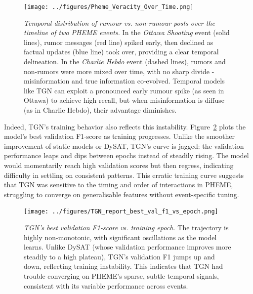 \documentclass{cshonours}
\begin{document}
\begin{figure}[htbp]

\centering

\texttt{[image: ../figures/Pheme\_Veracity\_Over\_Time.png]}

\caption[Temporal veracity trends in events]{\textit{Temporal distribution of rumour vs. non-rumour posts over the timeline of two PHEME events.} In the \emph{Ottawa Shooting} event (solid lines), rumor messages (red line) spiked early, then declined as factual updates (blue line) took over, providing a clear temporal delineation. In the \emph{Charlie Hebdo} event (dashed lines), rumors and non-rumors were more mixed over time, with no sharp divide - misinformation and true information co-evolved. Temporal models like TGN can exploit a pronounced early rumour spike (as seen in Ottawa) to achieve high recall, but when misinformation is diffuse (as in Charlie Hebdo), their advantage diminishes.}

\label{fig:veracity_time}

\end{figure}



Indeed, TGN's training behavior also reflects this instability. Figure~\ref{fig:tgn_val_f1} plots the model's best validation F1-score as training progresses. Unlike the smoother improvement of static models or DySAT, TGN's curve is jagged: the validation performance leaps and dips between epochs instead of steadily rising. The model would momentarily reach high validation scores but then regress, indicating difficulty in settling on consistent patterns. This erratic training curve suggests that TGN was sensitive to the timing and order of interactions in PHEME, struggling to converge on generalisable features without event-specific tuning.



\begin{figure}[htbp]

\centering

\texttt{[image: ../figures/TGN\_report\_best\_val\_f1\_vs\_epoch.png]}

\caption[TGN validation performance by epoch]{\textit{TGN's best validation F1-score vs. training epoch.} The trajectory is highly non-monotonic, with significant oscillations as the model learns. Unlike DySAT (whose validation performance improves more steadily to a high plateau), TGN's validation F1 jumps up and down, reflecting training instability. This indicates that TGN had trouble converging on PHEME's sparse, subtle temporal signals, consistent with its variable performance across events.}

\label{fig:tgn_val_f1}

\end{figure}
\end{document}
